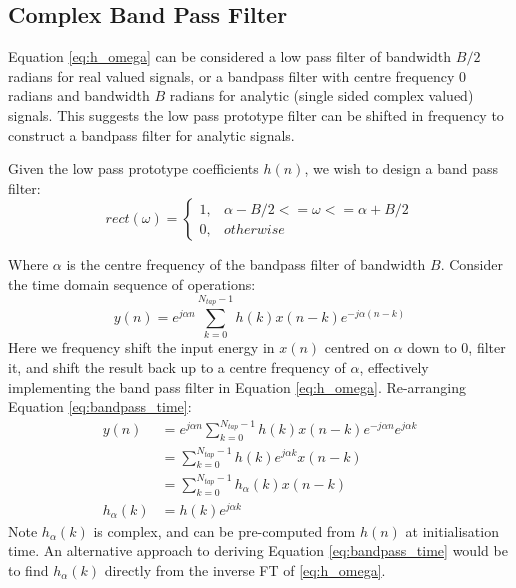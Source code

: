 \documentclass{article}
\begin{document}
\subsection{Complex Band Pass Filter}

Equation \ref{eq:h_omega} can be considered a low pass filter of bandwidth $B/2$ radians for real valued signals, or a bandpass filter with centre frequency 0 radians and bandwidth $B$ radians for analytic (single sided complex valued) signals. This suggests the low pass prototype filter can be shifted in frequency to construct a bandpass filter for analytic signals. 

Given the low pass prototype coefficients $h(n)$, we wish to design a band pass filter:
\begin{equation}
  rect(\omega)= 
	\begin{cases}
      1, & \alpha - B/2 <= \omega <= \alpha + B/2 \\
      0, & otherwise
	\end{cases}
\end{equation}

Where $\alpha$ is the centre frequency of the bandpass filter of bandwidth $B$.  Consider the time domain sequence of operations:
\begin{equation} \label{eq:bandpass_time}
y(n) = e^{j \alpha n} \sum_{k=0}^{N_{tap}-1} h(k) x(n-k) e^{-j \alpha (n-k)}
\end{equation}
Here we frequency shift the input energy in $x(n)$ centred on $\alpha$ down to 0, filter it, and shift the result back up to a centre frequency of $\alpha$, effectively implementing the band pass filter in Equation \ref{eq:h_omega}.  Re-arranging Equation \ref{eq:bandpass_time}:
\begin{equation} \label{eq:bandpass_time2}
\begin{split}
y(n) &= e^{j \alpha n} \sum_{k=0}^{N_{tap}-1}  h(k) x(n-k) e^{-j \alpha n} e^{j \alpha k} \\
     &= \sum_{k=0}^{N_{tap}-1} h(k) e^{j \alpha k} x(n-k) \\
     &= \sum_{k=0}^{N_{tap}-1} h_{\alpha}(k) x(n-k) \\
h_{\alpha}(k) &= h(k) e^{j \alpha k}     
\end{split}
\end{equation}
Note $h_{\alpha}(k)$ is complex, and can be pre-computed from $h(n)$ at initialisation time. An alternative approach to deriving Equation \ref{eq:bandpass_time} would be to find $h_{\alpha}(k)$ directly from the inverse FT of \eqref{eq:h_omega}.
\end{document}

